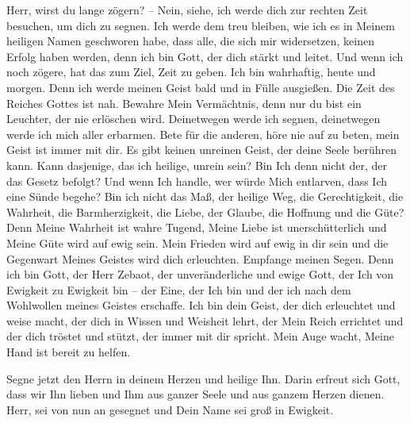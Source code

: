         Herr, wirst du lange zögern? -- Nein, siehe, ich werde dich zur rechten Zeit besuchen, um dich zu segnen. Ich werde dem treu bleiben, wie ich es in Meinem heiligen Namen geschworen habe, dass alle, die sich mir widersetzen, keinen Erfolg haben werden, denn ich bin Gott, der dich stärkt und leitet. Und wenn ich noch zögere, hat das zum Ziel, Zeit zu geben. Ich bin wahrhaftig, heute und morgen. Denn ich werde meinen Geist bald und in Fülle ausgießen. Die Zeit des Reiches Gottes ist nah. Bewahre Mein Vermächtnis, denn nur du bist ein Leuchter, der nie erlöschen wird. Deinetwegen werde ich segnen, deinetwegen werde ich mich aller erbarmen. Bete für die anderen, höre nie auf zu beten, mein Geist ist immer mit dir. Es gibt keinen unreinen Geist, der deine Seele berühren kann. Kann dasjenige, das ich heilige, unrein sein? Bin Ich denn nicht der, der das Gesetz befolgt? Und wenn Ich handle, wer würde Mich entlarven, dass Ich eine Sünde begehe? Bin ich nicht das Maß, der heilige Weg, die Gerechtigkeit, die Wahrheit, die Barmherzigkeit, die Liebe, der Glaube, die Hoffnung und die Güte? Denn Meine Wahrheit ist wahre Tugend, Meine Liebe ist unerschütterlich und Meine Güte wird auf ewig sein. Mein Frieden wird auf ewig in dir sein und die Gegenwart Meines Geistes wird dich erleuchten. Empfange meinen Segen. Denn ich bin Gott, der Herr Zebaot, der unveränderliche und ewige Gott, der Ich von Ewigkeit zu Ewigkeit bin -- der Eine, der Ich bin und der ich nach dem Wohlwollen meines Geistes erschaffe. Ich bin dein Geist, der dich erleuchtet und weise macht, der dich in Wissen und Weisheit lehrt, der Mein Reich errichtet und der dich tröstet und stützt, der immer mit dir spricht. Mein Auge wacht, Meine Hand ist bereit zu helfen. 
        
        Segne jetzt den Herrn in deinem Herzen und heilige Ihn. Darin erfreut sich Gott, dass wir Ihn lieben und Ihm aus ganzer Seele und aus ganzem Herzen dienen. Herr, sei von nun an gesegnet und Dein Name sei groß in Ewigkeit. 
        
